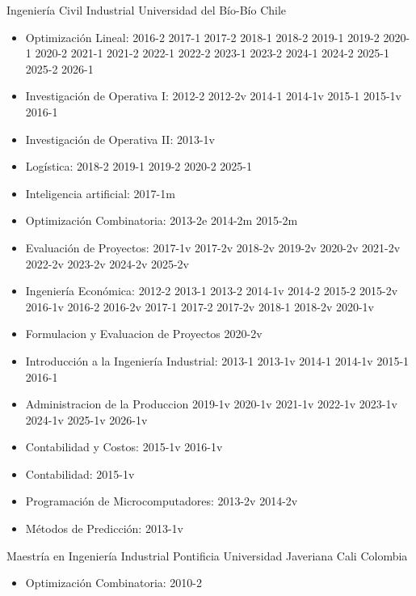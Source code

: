 {Ingenier\'ia Civil Industrial}
{Universidad del B\'io-B\'io}
{Chile}
{}
{\begin{itemize}
\item Optimizaci\'on Lineal: 2016-2 2017-1 2017-2 2018-1 2018-2 2019-1 2019-2 2020-1 2020-2 2021-1 2021-2 2022-1 2022-2 2023-1 2023-2 2024-1 2024-2 2025-1 2025-2 2026-1
\item Investigaci\'on de Operativa I: 2012-2 2012-2v 2014-1 2014-1v 2015-1 2015-1v 2016-1
\item Investigaci\'on de Operativa II: 2013-1v
\item Log\'istica: 2018-2 2019-1 2019-2 2020-2 2025-1
\item Inteligencia artificial: 2017-1m
\item Optimizaci\'on Combinatoria: 2013-2e 2014-2m 2015-2m
\item Evaluaci\'on de Proyectos: 2017-1v 2017-2v 2018-2v 2019-2v 2020-2v 2021-2v 2022-2v 2023-2v 2024-2v 2025-2v
\item Ingenier\'ia Econ\'omica: 2012-2 2013-1 2013-2 2014-1v 2014-2 2015-2 2015-2v 2016-1v 2016-2 2016-2v 2017-1 2017-2 2017-2v 2018-1 2018-2v 2020-1v
\item Formulacion y Evaluacion de Proyectos 2020-2v
\item Introducci\'on a la Ingenier\'ia Industrial: 2013-1 2013-1v 2014-1 2014-1v 2015-1 2016-1
\item Administracion de la Produccion 2019-1v 2020-1v 2021-1v 2022-1v 2023-1v 2024-1v 2025-1v 2026-1v
\item Contabilidad y Costos: 2015-1v 2016-1v
\item Contabilidad: 2015-1v
\item Programaci\'on de Microcomputadores: 2013-2v 2014-2v
\item M\'etodos de Predicci\'on: 2013-1v
\end{itemize}}


{Maestr\'ia en Ingenier\'ia Industrial}
{Pontificia Universidad Javeriana Cali}
{Colombia}
{}
{\begin{itemize}
\item Optimizaci\'on Combinatoria: 2010-2
\end{itemize}}


